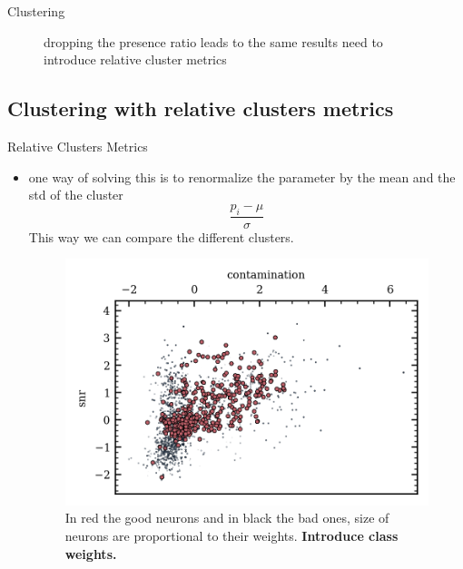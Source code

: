 \documentclass[numbering=fraction]{beamer}
\begin{document}
\begin{frame}{Clustering}
\begin{minipage}{.48\textwidth}
\begin{figure}[H]
            \caption{\scriptsize{dropping the presence ratio leads to the same results need to introduce relative cluster metrics}}
            \label{}
        \end{figure}
    \end{minipage}
\end{frame}
\subsection{Clustering with relative clusters metrics}
\begin{frame}{Relative Clusters Metrics}
    \begin{itemize}
        \item  one way of solving this is to renormalize the parameter by the mean and the std of the cluster
              $$\frac{p_i - \mu}{\sigma}$$ This way we can compare the different clusters.
              \begin{figure}[H]
                  \centering
                  \includegraphics[width=0.6\linewidth]{figure/clusters_weights.png}
                  \caption{\scriptsize{In red the good neurons and in black the bad ones, size of neurons are proportional to their weights. \textbf{Introduce class weights.}}}
                  \label{}

              \end{figure}
    \end{itemize}
\end{frame}
\end{document}
